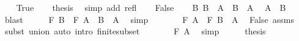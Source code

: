 \begin{isabellebody}
\ \ \isamarkupfalse%
\ True\ \isamarkupfalse%
\ \isamarkupfalse%
\ {\isacharquery}{\kern0pt}thesis\ \isamarkupfalse%
\ {\isacharparenleft}{\kern0pt}simp\ add{\isacharcolon}{\kern0pt}\ refl{\isacharparenright}{\kern0pt}\isanewline
{}\isamarkupfalse%
\isanewline
\ \ \isamarkupfalse%
\ False\isanewline
\ \ \isamarkupfalse%
\ B{\isacharcolon}{\kern0pt}\ {\isachardoublequoteopen}B\ {\isacharequal}{\kern0pt}\ A\ {\isasymunion}\ {\isacharparenleft}{\kern0pt}B\ {\isacharminus}{\kern0pt}\ A{\isacharparenright}{\kern0pt}{\isachardoublequoteclose}\ \isamarkupfalse%
\ {\isacartoucheopen}A\ {\isasymsubseteq}\ B{\isacartoucheclose}\ \isamarkupfalse%
\ blast\isanewline
\ \ \isamarkupfalse%
\ \isamarkupfalse%
\ {\isachardoublequoteopen}F\ B\ {\isacharequal}{\kern0pt}\ F\ {\isacharparenleft}{\kern0pt}A\ {\isasymunion}\ {\isacharparenleft}{\kern0pt}B\ {\isacharminus}{\kern0pt}\ A{\isacharparenright}{\kern0pt}{\isacharparenright}{\kern0pt}{\isachardoublequoteclose}\ \isamarkupfalse%
\ simp\isanewline
\ \ \isamarkupfalse%
\ \isamarkupfalse%
\ {\isachardoublequoteopen}{\isasymdots}\ {\isacharequal}{\kern0pt}\ F\ A\ \isactrlbold {\isacharasterisk}{\kern0pt}\ F\ {\isacharparenleft}{\kern0pt}B\ {\isacharminus}{\kern0pt}\ A{\isacharparenright}{\kern0pt}{\isachardoublequoteclose}\ \isamarkupfalse%
\ False\ assms\ \isamarkupfalse%
\ {\isacharparenleft}{\kern0pt}subst\ union{\isacharparenright}{\kern0pt}\ {\isacharparenleft}{\kern0pt}auto\ intro{\isacharcolon}{\kern0pt}\ finite{\isacharunderscore}{\kern0pt}subset{\isacharparenright}{\kern0pt}\isanewline
\ \ \isamarkupfalse%
\ \isamarkupfalse%
\ {\isachardoublequoteopen}{\isasymdots}\ \isactrlbold {\isasymle}\ F\ A{\isachardoublequoteclose}\ \isamarkupfalse%
\ simp\isanewline
\ \ \isamarkupfalse%
\ \isamarkupfalse%
\ {\isacharquery}{\kern0pt}thesis\ \isacommand{{\isachardot}{\kern0pt}}\isamarkupfalse%
\isanewline
{}\isamarkupfalse%
%
\endisatagproof
{\isafoldproof}%
%
\isadelimproof
\isanewline
%
\endisadelimproof
\isanewline
{}\isamarkupfalse%
%
\isadelimdocument
%
\endisadelimdocument
%
\isatagdocument
%
\isamarkuptrue%
%
\endisatagdocument
{\isafolddocument}%
%
\isadelimdocument
%
\endisadelimdocument

\end{isabellebody}
